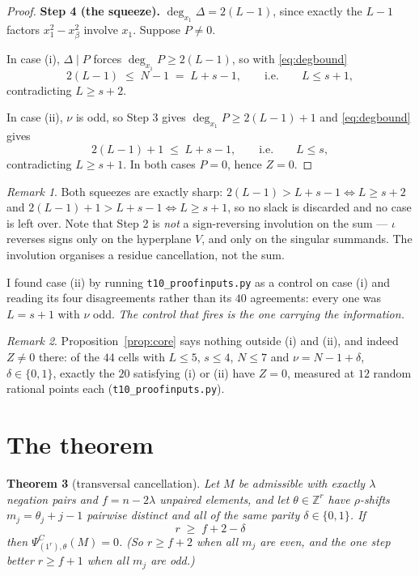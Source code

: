 \documentclass[11pt]{article}
\newtheorem{theorem}{Theorem}
\theoremstyle{definition}
\theoremstyle{remark}
\newtheorem{remark}[theorem]{Remark}
\newcommand{\PsiC}{\Psi^{C}}
\newcommand{\ZZ}{\mathbb{Z}}
\newcommand{\bftheta}{\theta}
\begin{document}
\begin{proof}
\smallskip\noindent\textbf{Step 4 (the squeeze).} $\deg_{x_1}\Delta=2(L-1)$, since
exactly the $L-1$ factors $x_1^2-x_\beta^2$ involve $x_1$. Suppose $P\neq0$.

In case (i), $\Delta\mid P$ forces $\deg_{x_1}P\ge2(L-1)$, so with \eqref{eq:degbound}
\[
  2(L-1)\;\le\;N-1\;=\;L+s-1,\qquad\text{i.e.}\qquad L\le s+1 ,
\]
contradicting $L\ge s+2$.

In case (ii), $\nu$ is odd, so Step 3 gives $\deg_{x_1}P\ge2(L-1)+1$ and
\eqref{eq:degbound} gives
\[
  2(L-1)+1\;\le\;L+s-1,\qquad\text{i.e.}\qquad L\le s ,
\]
contradicting $L\ge s+1$. In both cases $P=0$, hence $Z=0$.
\end{proof}

\begin{remark}\label{rem:sharp}
Both squeezes are exactly sharp: $2(L-1)>L+s-1\iff L\ge s+2$ and
$2(L-1)+1>L+s-1\iff L\ge s+1$, so no slack is discarded and no case is left over. Note
that Step 2 is \emph{not} a sign-reversing involution on the sum --- $\iota$ reverses
signs only on the hyperplane $V$, and only on the singular summands. The involution
organises a residue cancellation, not the sum.

I found case (ii) by running \texttt{t10\_proofinputs.py} as a control on
case (i) and reading its four disagreements rather than its $40$ agreements: every one
was $L=s+1$ with $\nu$ odd. \emph{The control that fires is the one carrying the
information.}
\end{remark}

\begin{remark}
Proposition~\ref{prop:core} says nothing outside (i) and (ii), and indeed $Z\neq0$
there: of the $44$ cells with $L\le5$, $s\le4$, $N\le7$ and $\nu=N-1+\delta$,
$\delta\in\{0,1\}$, exactly the $20$ satisfying (i) or (ii) have $Z=0$, measured at $12$
random rational points each (\texttt{t10\_proofinputs.py}).
\end{remark}

\section{The theorem}

\begin{theorem}[transversal cancellation]\label{thm:main}
Let $M$ be admissible with exactly $\lambda$ negation pairs and $f=n-2\lambda$ unpaired
elements, and let $\bftheta\in\ZZ^{r}$ have $\rho$-shifts $m_j=\theta_j+j-1$ pairwise
distinct and \emph{all of the same parity} $\delta\in\{0,1\}$. If
\[
  r\;\ge\;f+2-\delta
\]
then $\PsiC_{(1^r),\bftheta}(M)=0$. (So $r\ge f+2$ when all $m_j$ are even, and the one
step better $r\ge f+1$ when all $m_j$ are odd.)
\end{theorem}
\end{document}
